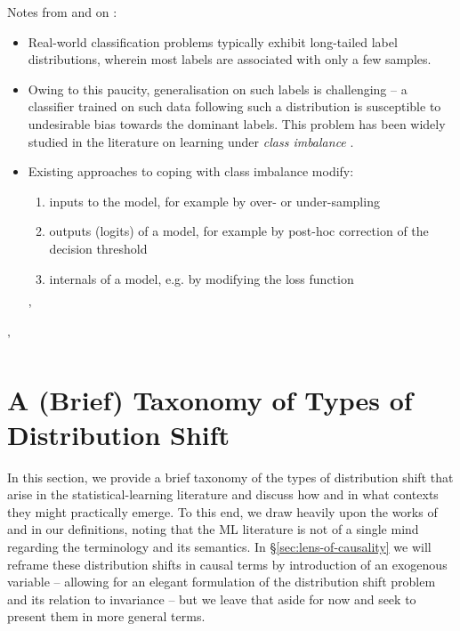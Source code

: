 Notes from and on \cite{menon2020long}:
%
\begin{itemize}
        \item Real-world classification problems typically exhibit long-tailed label distributions,
          wherein most labels are associated with only a few samples.
        \item Owing to this paucity, generalisation on such labels is challenging -- a classifier
          trained on such data following such a distribution is susceptible to undesirable bias
          towards the dominant labels. 
          This problem has been widely studied in the literature on learning under \emph{class
          imbalance} \citep{cardie1997improving}.
        \item 
          Existing approaches to coping with class imbalance modify: 
          \begin{enumerate}
            \item inputs to the model, for example by over- or under-sampling
              \citep{kubat1997addressing, chawla2002smote} \item outputs (logits) of a model, for
              example by post-hoc correction of the decision threshold \citep{fawcett1996combining}
            \item internals of a model, e.g. by modifying the loss function 
          \end{enumerate}'

\end{itemize}'


\section{A (Brief) Taxonomy of Types of Distribution Shift}
In this section, we provide a brief taxonomy of the types of distribution shift that arise in the
statistical-learning literature and discuss how and in what contexts they might practically emerge.
%
To this end, we draw heavily upon the works of \cite{moreno2012unifying} and
\cite{castro2020causality} in our definitions, noting that the ML literature is not of a
single mind regarding the terminology and its semantics.
%
In \S \ref{sec:lens-of-causality} we will reframe these distribution shifts in causal terms by
introduction of an exogenous variable -- allowing for an elegant formulation of the distribution
shift problem and its relation to invariance -- but we leave that aside for now and seek to present
them in more general terms.
